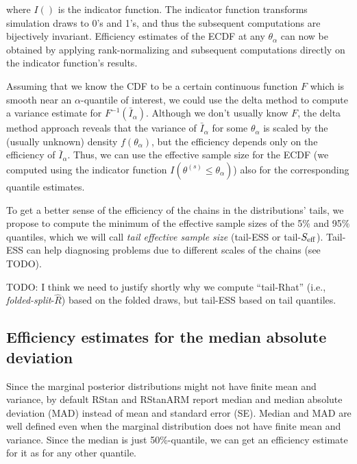 \documentclass[american,]{article}
\begin{document}
where \(I()\) is the indicator function. The indicator function
transforms simulation draws to 0's and 1's, and thus the subsequent
computations are bijectively invariant. Efficiency estimates of the ECDF
at any \(\theta_\alpha\) can now be obtained by applying
rank-normalizing and subsequent computations directly on the indicator
function's results.

Assuming that we know the CDF to be a certain continuous function \(F\)
which is smooth near an \(\alpha\)-quantile of interest, we could use
the delta method to compute a variance estimate for
\(F^{-1}(\bar{I}_\alpha)\). Although we don't usually know \(F\), the
delta method approach reveals that the variance of \(\bar{I}_\alpha\)
for some \(\theta_\alpha\) is scaled by the (usually unknown) density
\(f(\theta_\alpha)\), but the efficiency depends only on the efficiency
of \(\bar{I}_\alpha\). Thus, we can use the effective sample size for
the ECDF (we computed using the indicator function
\(I(\theta^{(s)} \leq \theta_\alpha)\)) also for the corresponding
quantile estimates.

To get a better sense of the efficiency of the chains in the
distributions' tails, we propose to compute the minimum of the effective
sample sizes of the 5\% and 95\% quantiles, which we will call
\emph{tail effective sample size} (tail-ESS or tail-\(S_{\rm eff}\)).
Tail-ESS can help diagnosing problems due to different scales of the
chains (see TODO).

TODO: I think we need to justify shortly why we compute ``tail-Rhat''
(i.e., \emph{folded-split}-\(\widehat{R}\)) based on the folded draws,
but tail-ESS based on tail quantiles.

\hypertarget{efficiency-estimates-for-the-median-absolute-deviation}{%
\subsection{Efficiency estimates for the median absolute
deviation}\label{efficiency-estimates-for-the-median-absolute-deviation}}

Since the marginal posterior distributions might not have finite mean
and variance, by default RStan \citep{RStan.2.17} and RStanARM
\citep{RStanARM.2.17} report median and median absolute deviation (MAD)
instead of mean and standard error (SE). Median and MAD are well defined
even when the marginal distribution does not have finite mean and
variance. Since the median is just 50\%-quantile, we can get an
efficiency estimate for it as for any other quantile.
\end{document}
